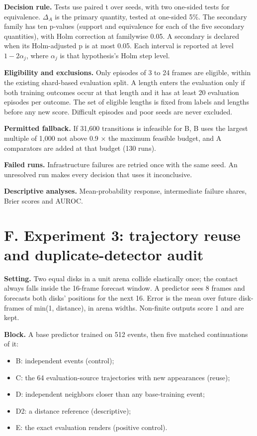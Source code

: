 \documentclass[10pt,letterpaper]{article}
\providecommand{\tightlist}{\setlength{\itemsep}{0pt}\setlength{\parskip}{0pt}}
\begin{document}
\textbf{Decision rule.} Tests use paired t over seeds, with
two one-sided tests for equivalence. \(\Delta_A\) is the
primary quantity, tested at one-sided 5\%. The secondary
family has ten p-values (support and equivalence for each of
the five secondary quantities), with Holm correction at
familywise 0.05. A secondary is declared when its
Holm-adjusted p is at most 0.05. Each interval is reported
at level \(1 - 2\alpha_j\), where \(\alpha_j\) is that
hypothesis's Holm step level.

\textbf{Eligibility and exclusions.} Only episodes of 3 to
24 frames are eligible, within the existing shard-based
evaluation split. A length enters the evaluation only if
both training outcomes occur at that length and it has at
least 20 evaluation episodes per outcome. The set of
eligible lengths is fixed from labels and lengths before any
new score. Difficult episodes and poor seeds are never
excluded.

\textbf{Permitted fallback.} If 31,600 transitions is
infeasible for B, B uses the largest multiple of 1,000 not
above 0.9 × the maximum feasible budget, and A comparators
are added at that budget (130 runs).

\textbf{Failed runs.} Infrastructure failures are retried
once with the same seed. An unresolved run makes every
decision that uses it inconclusive.

\textbf{Descriptive analyses.} Mean-probability response,
intermediate failure shares, Brier scores and AUROC.

\hypertarget{f.-experiment-3-trajectory-reuse-and-duplicate-detector-audit}{%
\section{F. Experiment 3: trajectory reuse and
duplicate-detector
audit}\label{f.-experiment-3-trajectory-reuse-and-duplicate-detector-audit}}

\textbf{Setting.} Two equal disks in a unit arena collide
elastically once; the contact always falls inside the
16-frame forecast window. A predictor sees 8 frames and
forecasts both disks' positions for the next 16. Error is
the mean over future disk-frames of min(1, distance), in
arena widths. Non-finite outputs score 1 and are kept.

\textbf{Block.} A base predictor trained on 512 events, then
five matched continuations of it:

\begin{itemize}
\tightlist
\item
  B: independent events (control);
\item
  C: the 64 evaluation-source trajectories with new
  appearances (reuse);
\item
  D: independent neighbors closer than any base-training
  event;
\item
  D2: a distance reference (descriptive);
\item
  E: the exact evaluation renders (positive control).
\end{itemize}
\end{document}
